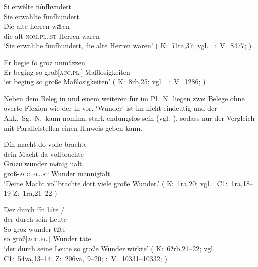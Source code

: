 \begin{exe}
\ex \label{ex:kckregel}
	\begin{xlist}
	\ex \label{ex:kckregel_1}
		\gll Si erwêlte fu̍nfhvndert \\
			Sie erwählte fünfhundert \\
	\sn \gll Die alte herren waͤren \\
			die alt-\textsc{nom.pl.\MascM.st} Herren waren \\
		\trans `Sie erwählte fünfhundert, die alte Herren waren'
			(%
				K:~51ra,37; vgl.~%
				\KC:~V.~8477;
				\cite[237]{schroeder1895}%
			)

	\ex \label{ex:kckregel_2}
		\gll Er begie ſo groz unmâzzen \\
			Er beging so groß[\textsc{acc.pl.\FemI}] Maßlosigkeiten \\
		\trans `er beging so große Maßlosigkeiten'
			(%
				K:~8rb,25; vgl.~%
				\KC:~V.~1286;
				\cite[105]{schroeder1895}%
			)
	\end{xlist}
\end{exe}

Neben dem Beleg in  und einem weiteren für  im
Pl.~N.\ liegen zwei Belege ohne overte Flexion wie der in 
vor.  `Wunder' ist im  nicht
eindeutig und der Akk.\ Sg.\ N.\ kann nominal-stark
endungslos sein (vgl.~),
sodass nur der Vergleich mit Parallelstellen einen Hinweis
geben kann.

\begin{exe}
\ex	\begin{xlist}
	\ex \label{ex:kckregel_3}
		\gll Dín macht do {volle brachte} \\
			dein Macht da vollbrachte \\
	\sn \gll Groͤzu̍ wunder {maͤnig ualt} \\
			groß-\textsc{acc.pl.\NeutI.st} Wunder mannigfalt \\
		\trans `Deine Macht vollbrachte dort viele große Wunder.'
			(%
				K:~1ra,20; vgl.~%
				C1:~1ra,18--19%
				Z:~1ra,21--22%
			)

	\ex \label{ex:kckregel_4}
		\gll Der durch ſín lu̍te {/} \\
			der durch sein Leute \\
		\gll So groz wunder tu̍te \\
			so groß[\textsc{acc.pl.\NeutI}] Wunder täte \\
		\trans `der durch seine Leute so große Wunder wirkte'
			(%
				K:~62rb,21--22; vgl.~%
				C1:~54va,13--14;
				Z:~206va,19--20;
				\KC:~V.~10331--10332;
				\cite[271]{schroeder1895}%
			)
	\end{xlist}
\end{exe}

